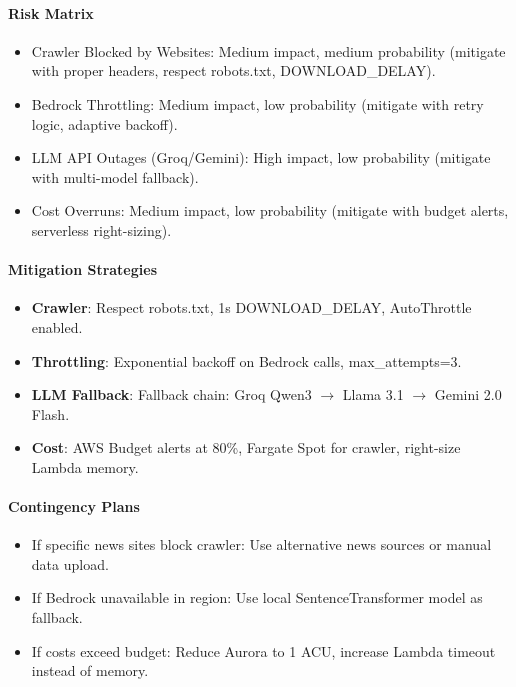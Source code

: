 \hypertarget{risk-matrix}{%
\paragraph{Risk Matrix}}

\begin{itemize}
\tightlist
\item
  Crawler Blocked by Websites: Medium impact, medium probability
  (mitigate with proper headers, respect robots.txt, DOWNLOAD\_DELAY).
\item
  Bedrock Throttling: Medium impact, low probability (mitigate with
  retry logic, adaptive backoff).
\item
  LLM API Outages (Groq/Gemini): High impact, low probability (mitigate
  with multi-model fallback).
\item
  Cost Overruns: Medium impact, low probability (mitigate with budget
  alerts, serverless right-sizing).
\end{itemize}

\hypertarget{mitigation-strategies}{%
\paragraph{Mitigation Strategies}}

\begin{itemize}
\tightlist
\item
  \textbf{Crawler}: Respect robots.txt, 1s DOWNLOAD\_DELAY, AutoThrottle
  enabled.
\item
  \textbf{Throttling}: Exponential backoff on Bedrock calls,
  max\_attempts=3.
\item
  \textbf{LLM Fallback}: Fallback chain: Groq Qwen3 \(\rightarrow\)
  Llama 3.1 \(\rightarrow\) Gemini 2.0 Flash.
\item
  \textbf{Cost}: AWS Budget alerts at 80\%, Fargate Spot for crawler,
  right-size Lambda memory.
\end{itemize}

\hypertarget{contingency-plans}{%
\paragraph{Contingency Plans}}

\begin{itemize}
\tightlist
\item
  If specific news sites block crawler: Use alternative news sources or
  manual data upload.
\item
  If Bedrock unavailable in region: Use local SentenceTransformer model
  as fallback.
\item
  If costs exceed budget: Reduce Aurora to 1 ACU, increase Lambda
  timeout instead of memory.
\end{itemize}

